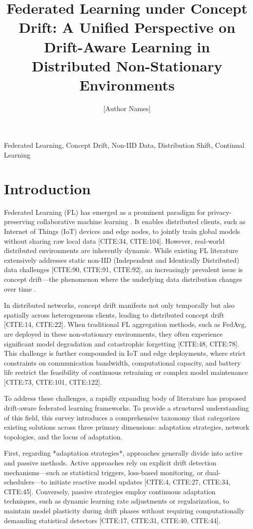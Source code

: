 \documentclass[journal]{IEEEtran}
\title{Federated Learning under Concept Drift: A Unified Perspective on Drift-Aware Learning in Distributed Non-Stationary Environments}
\author{[Author Names]}
\begin{document}
\begin{abstract}
\end{abstract}

\begin{IEEEkeywords}Federated Learning, Concept Drift, Non-IID Data, Distribution Shift, Continual Learning\end{IEEEkeywords}

\section{Introduction}
\label{sec:introduction}

Federated Learning (FL) has emerged as a prominent paradigm for privacy-preserving collaborative machine learning \cite{Collins2025}. It enables distributed clients, such as Internet of Things (IoT) devices and edge nodes, to jointly train global models without sharing raw local data [CITE:34, CITE:104]. However, real-world distributed environments are inherently dynamic. While existing FL literature extensively addresses static non-IID (Independent and Identically Distributed) data challenges [CITE:90, CITE:91, CITE:92], an increasingly prevalent issue is concept drift—the phenomenon where the underlying data distribution changes over time \cite{Martin2025}. 

In distributed networks, concept drift manifests not only temporally but also spatially across heterogeneous clients, leading to distributed concept drift [CITE:14, CITE:22]. When traditional FL aggregation methods, such as FedAvg, are deployed in these non-stationary environments, they often experience significant model degradation and catastrophic forgetting [CITE:48, CITE:78]. This challenge is further compounded in IoT and edge deployments, where strict constraints on communication bandwidth, computational capacity, and battery life restrict the feasibility of continuous retraining or complex model maintenance [CITE:73, CITE:101, CITE:122].

To address these challenges, a rapidly expanding body of literature has proposed drift-aware federated learning frameworks. To provide a structured understanding of this field, this survey introduces a comprehensive taxonomy that categorizes existing solutions across three primary dimensions: adaptation strategies, network topologies, and the locus of adaptation. 

First, regarding *adaptation strategies*, approaches generally divide into active and passive methods. Active approaches rely on explicit drift detection mechanisms—such as statistical triggers, loss-based monitoring, or dual-schedulers—to initiate reactive model updates [CITE:4, CITE:27, CITE:34, CITE:45]. Conversely, passive strategies employ continuous adaptation techniques, such as dynamic learning rate adjustments or regularization, to maintain model plasticity during drift phases without requiring computationally demanding statistical detectors [CITE:17, CITE:31, CITE:40, CITE:44]. 
\end{document}
